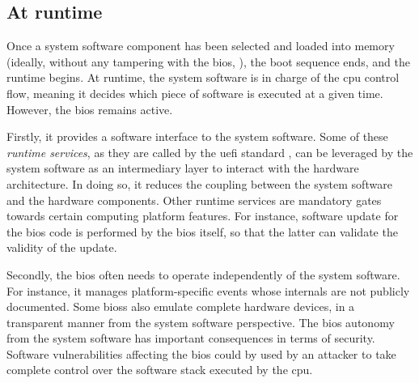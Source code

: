\subsection{At runtime}
\label{subsec:usecase:firm:runtime}

Once a system software component has been selected and loaded into memory
(ideally, without any tampering with the \ac{bios}, ), the boot
sequence ends, and the runtime begins.
%
At runtime, the system software is in charge of the \ac{cpu} control flow,
meaning it decides which piece of software is executed at a given time.
%
However, the \ac{bios} remains active.

Firstly, it provides a software interface to the system software.
%
%
Some of these \emph{runtime services}, as they are called by the \ac{uefi}
standard , can be leveraged
by the system software as an intermediary layer to interact with the hardware
architecture.
%
In doing so, it reduces the coupling between the system software and the
hardware components.
%
Other runtime services are mandatory gates towards certain computing platform
features.
%
%
For instance, software update for the \ac{bios} code is performed by the
\ac{bios} itself, so that the latter can validate the validity of the update.

Secondly, the \ac{bios} often needs to operate independently of the system
software.
%
%
For instance, it manages platform-specific events whose internals are not
publicly documented.
%
Some \acp{bios} also emulate complete hardware devices, in a transparent manner
from the system software perspective.
%
The \ac{bios} autonomy 
from the system software has important consequences in terms of security.
%
Software vulnerabilities affecting the \ac{bios} could by used by an attacker to
take complete control over the software stack executed by the \ac{cpu}.

